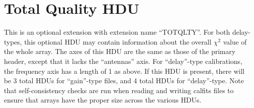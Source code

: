 \documentclass[11pt, oneside, english]{article}   	%
\begin{document}
\section{Total Quality HDU}
This is an optional extension with extension name ``TOTQLTY''.
For both delay-types, this optional HDU may contain information about the overall $\chi^2$ value of the whole array. 
The axes of this HDU are the same as those of the primary header, except that it lacks the ``antennas'' axis.
For ``delay''-type calibrations, the frequency axis has a length of 1 as above. 
If this HDU is present, there will be 3 total HDUs for ``gain''-type files, and 4 total HDUs for ``delay''-type. 
Note that self-consistency checks are run when reading and writing calfits files to ensure that arrays have the proper size across the various HDUs.
\end{document}

